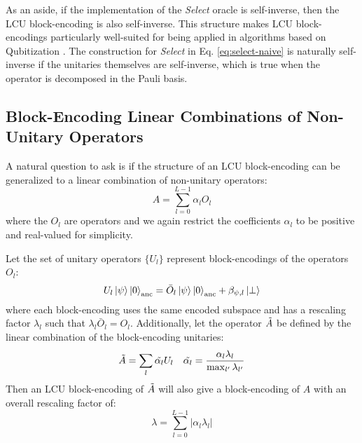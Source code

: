 As an aside, if the implementation of the \textit{Select} oracle is self-inverse, then the LCU block-encoding is also self-inverse.
This structure makes LCU block-encodings particularly well-suited for being applied in algorithms based on Qubitization \cite{low2019hamiltonian}.
The construction for \textit{Select} in Eq. \ref{eq:select-naive} is naturally self-inverse if the unitaries themselves are self-inverse, which is true when the operator is decomposed in the Pauli basis.

\subsection{Block-Encoding Linear Combinations of Non-Unitary Operators}
\label{subsec:lco}

A natural question to ask is if the structure of an LCU block-encoding can be generalized to a linear combination of non-unitary operators:
\begin{equation}
    \label{eq:lco}
    A = \sum_{l=0}^{L-1} \alpha_l O_l
\end{equation}
where the $O_l$ are operators and we again restrict the coefficients $\alpha_l$ to be positive and real-valued for simplicity.

Let the set of unitary operators $\{U_l\}$ represent block-encodings of the operators $O_l$:
\begin{equation}
    \label{eq:applying-operator}
    U_l \ket{\psi}\ket{0}_\text{anc} = \bar{O}_l \ket{\psi} \ket{0}_\text{anc} + \beta_{\psi, l} \ket{\perp}
\end{equation}
where each block-encoding uses the same encoded subspace and has a rescaling factor $\lambda_l$ such that $\lambda_l \bar{O}_l = O_l$.
Additionally, let the operator $\Tilde{A}$ be defined by the linear combination of the block-encoding unitaries:
\begin{equation}
    \Tilde{A} = \sum_{l} \Tilde{\alpha_l} U_l \hspace{1em} \Tilde{\alpha_l} = \frac{\alpha_l \lambda_l}{\max_{l^\prime}{\lambda_{l^\prime}}}
\end{equation} 
Then an LCU block-encoding of $\Tilde{A}$ will also give a block-encoding of $A$ with an overall rescaling factor of:
\begin{equation}
    \lambda = \sum_{l=0}^{L-1} |\alpha_l \lambda_l|
\end{equation}

